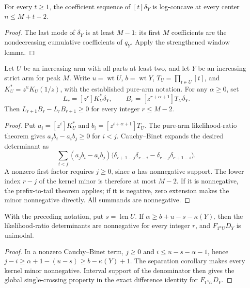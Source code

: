 \begin{corollary}
For every $t\ge1$, the coefficient sequence of $[t]\delta_Y$ is
log-concave at every center $n\le M+t-2$.
\end{corollary}
\begin{proof}
The last mode of $\delta_Y$ is at least $M-1$: its first $M$
coefficients are the nondecreasing cumulative coefficients of
$q_Y$. Apply the strengthened window lemma.
\end{proof}

\begin{corollary}
Let $U$ be an increasing arm with all parts at least two, and let
$Y$ be an increasing strict arm for peak $M$. Write $u=\operatorname{wt}U$,
$b=\operatorname{wt}Y$, $T_U=\prod_{t\in U}[t]$, and
$K_U^*=z^u K_U(1/z)$, with the established pure-arm notation. For any
$\alpha\ge0$, set
\[
 L_r=[z^r]K_U^*\delta_Y,\qquad
 B_r=[z^{r+\alpha+1}]T_U\delta_Y.
\]
Then $L_{r+1}B_r-L_rB_{r+1}\ge0$ for every integer $r\le M-2$.
\end{corollary}
\begin{proof}
Put $a_i=[z^i]K_U^*$ and $b_i=[z^{i+\alpha+1}]T_U$.
The pure-arm likelihood-ratio theorem gives
$a_jb_i-a_ib_j\ge0$ for $i<j$. Cauchy--Binet expands the desired
determinant as
\[
 \sum_{i<j}(a_jb_i-a_ib_j)
 \bigl(\delta_{r+1-j}\delta_{r-i}
       -\delta_{r-j}\delta_{r+1-i}\bigr).
\]
A nonzero first factor requires $j\ge0$, since $a$ has nonnegative
support. The lower index $r-j$ of the kernel minor is therefore at
most $M-2$. If it is nonnegative, the prefix-to-tail theorem applies;
if it is negative, zero extension makes the minor nonnegative
directly. All summands are nonnegative.
\end{proof}

\begin{corollary}
With the preceding notation, put $s=\operatorname{len}U$.
If $\alpha\ge b+u-s-\kappa(Y)$, then the likelihood-ratio
determinants are nonnegative for every integer $r$, and
$F_{1^\alpha U}D_Y$ is unimodal.
\end{corollary}
\begin{proof}
In a nonzero Cauchy--Binet term, $j\ge0$ and
$i\le u-s-\alpha-1$, hence
$j-i\ge\alpha+1-(u-s)\ge b-\kappa(Y)+1$.
The separation corollary makes every kernel minor nonnegative.
Interval support of the denominator then gives the global
single-crossing property in the exact difference identity for
$F_{1^\alpha U}D_Y$.
\end{proof}

